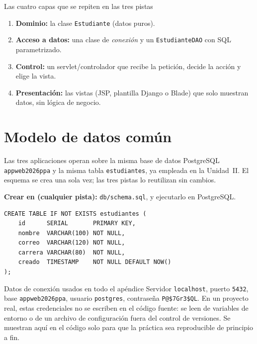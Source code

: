 \documentclass[11pt,a4paper,openany]{book}
\begin{document}
\begin{cajabuenas}{Las cuatro capas que se repiten en las tres pistas}
\begin{enumerate}
\item \textbf{Dominio:} la clase \texttt{Estudiante} (datos puros).
\item \textbf{Acceso a datos:} una clase de \emph{conexión} y un
\texttt{EstudianteDAO} con SQL parametrizado.
\item \textbf{Control:} un servlet/controlador que recibe la petición,
decide la acción y elige la vista.
\item \textbf{Presentación:} las vistas (JSP, plantilla Django o Blade)
que solo muestran datos, sin lógica de negocio.
\end{enumerate}
\end{cajabuenas}

\section{Modelo de datos común}
\label{ap:crud:modelo}

Las tres aplicaciones operan sobre la misma base de datos PostgreSQL
\texttt{appweb2026ppa} y la misma tabla \texttt{estudiantes}, ya
empleada en la Unidad~II. El esquema se crea una sola vez; las tres
pistas lo reutilizan sin cambios.

{\small\textbf{Crear en (cualquier pista):} \texttt{db/schema.sql}, y
ejecutarlo en PostgreSQL.}
\begin{lstlisting}[style=sql,caption={Esquema compartido de la tabla estudiantes},label={lst:crud-schema}]
CREATE TABLE IF NOT EXISTS estudiantes (
    id      SERIAL       PRIMARY KEY,
    nombre  VARCHAR(100) NOT NULL,
    correo  VARCHAR(120) NOT NULL,
    carrera VARCHAR(80)  NOT NULL,
    creado  TIMESTAMP    NOT NULL DEFAULT NOW()
);
\end{lstlisting}

\begin{cajaadvertencia}{Datos de conexión usados en todo el apéndice}
Servidor \texttt{localhost}, puerto \texttt{5432}, base
\texttt{appweb2026ppa}, usuario \texttt{postgres}, contraseña
\texttt{P@\$7Gr3\$QL}. En un proyecto real, estas credenciales no se
escriben en el código fuente: se leen de variables de entorno o de un
archivo de configuración fuera del control de versiones. Se muestran
aquí en el código solo para que la práctica sea reproducible de
principio a fin.
\end{cajaadvertencia}
\end{document}

